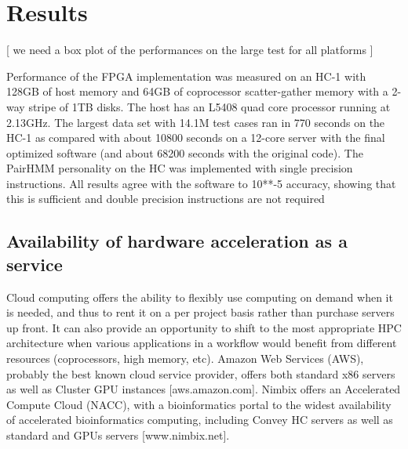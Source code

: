 \documentclass[11pt, oneside]{article}
\begin{document}
	\section{Results}


    [ we need a box plot of the performances on the large test for all platforms ]
	
	Performance of the FPGA implementation was measured on an HC-1 with 128GB of
	host memory and 64GB of coprocessor scatter-gather memory with a 2-way
	stripe of 1TB disks.  The host has an L5408 quad core processor running at
	2.13GHz.  The largest data set with 14.1M test cases ran in 770 seconds on
	the HC-1 as compared with about 10800 seconds on a 12-core server with the
	final optimized software (and about 68200 seconds with the original code).
	The PairHMM personality on the HC was implemented with single precision
	instructions.  All results agree with the software to 10**-5 accuracy,
	showing that this is sufficient and double precision instructions are not
	required


	\subsection{Availability of hardware acceleration as a service} 

	Cloud computing offers the ability to flexibly use computing on demand when
	it is needed, and thus to rent it on a per project basis rather than
	purchase servers up front.  It can also provide an opportunity to shift to
	the most appropriate HPC architecture when various applications in a
	workflow would benefit from different resources (coprocessors, high memory,
	etc).  Amazon Web Services (AWS), probably the best known cloud
	service provider, offers both standard x86 servers as well as Cluster GPU
	instances [aws.amazon.com].  Nimbix offers an Accelerated Compute Cloud
	(NACC), with a bioinformatics portal to the widest availability of
	accelerated bioinformatics computing, including Convey HC servers as well as
	standard and GPUs servers [www.nimbix.net].
\end{document}
